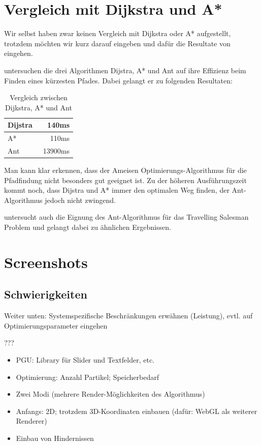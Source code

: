 \section{Vergleich mit Dijkstra und A*}

Wir selbst haben zwar keinen Vergleich mit Dijkstra oder A* aufgestellt, trotzdem möchten wir kurz darauf eingeben und dafür die Resultate von \citet*{leo-perf} eingehen.

\citeauthor*{leo-perf} untersuchen die drei Algorithmen Dijstra, A* und Ant auf ihre Effizienz beim Finden eines kürzesten Pfades. Dabei gelangt er zu folgenden Resultaten:

\begin{table}[h]
\begin{tabular}{ | l | r | }
\hline
Dijstra & ~140ms \\
\hline
A* & ~110ms \\
\hline
Ant & ~13900ms \\
\hline
\end{tabular}
\caption{Vergleich zwischen Dijkstra, A* und Ant}
\end{table}

Man kann klar erkennen, dass der Ameisen Optimierungs-Algorithmus für die Pfadfindung nicht besonders gut geeignet ist. Zu der höheren Ausführungszeit kommt noch, dass Dijstra und A* immer den optimalen Weg finden, der Ant-Algorithmus jedoch nicht zwingend.

\citeauthor*{leo-perf} untersucht auch die Eignung des Ant-Algorithmus für das Travelling Salesman Problem und gelangt dabei zu ähnlichen Ergebnissen.

\section{Screenshots}

\subsection{Schwierigkeiten}

Weiter unten: Systemspezifische Beschränkungen erwähnen (Leistung), evtl. auf Optimierungsparameter eingehen

???
\begin{itemize}[noitemsep]
\item PGU: Library für Slider und Textfelder, etc.
\item Optimierung: Anzahl Partikel; Speicherbedarf
\item Zwei Modi (mehrere Render-Möglichkeiten des Algorithmus)
\item Anfangs: 2D; trotzdem 3D-Koordinaten einbauen (dafür: WebGL als weiterer Renderer)
\item Einbau von Hindernissen
\end{itemize}

